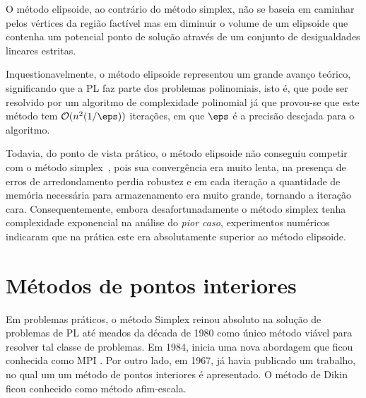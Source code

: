 O  método elipsoide, ao contrário do método simplex,  não se baseia em caminhar pelos
vértices da região factível mas em diminuir o volume de um elipsoide que
contenha um potencial ponto de solução através de um conjunto de desigualdades
lineares estritas.

Inquestionavelmente, o método elipsoide representou um grande avanço teórico,
significando que a \acl{PL} faz parte dos problemas polinomiais, isto é, que
pode ser resolvido por um algoritmo de complexidade polinomial já que provou-se
que este método tem $\mathcal{O}(n^2(1/\eps))$ iterações, em
que $\eps$ é a precisão desejada para o algoritmo.

Todavia, do ponto de vista prático, o método elipsoide não conseguiu competir com o
método simplex~\cite{Bland:1981vn}, pois sua convergência era muito lenta, na
presença de erros de arredondamento perdia robustez e em cada iteração a
quantidade de memória necessária para armazenamento era muito grande, tornando a iteração cara.
Consequentemente, embora desafortunadamente o método simplex tenha complexidade
exponencial na análise do \emph{pior caso}, experimentos numéricos indicaram que
na prática este era absolutamente superior ao método elipsoide.


\section{Métodos de pontos interiores}



Em problemas práticos, o método Simplex reinou absoluto na solução de problemas
de \ac{PL} até meados da década de 1980 como único método viável para resolver
tal classe de problemas. Em 1984, \textcite{Karmarkar:1984cp} inicia uma nova
abordagem que ficou conhecida como
\acf{MPI} . Por outro lado,  em 1967,
\textcite{DIKIN:InterativeSol1967} já havia publicado um trabalho, no qual um 
 um método de pontos interiores é apresentado. O método de Dikin ficou
conhecido como método afim-escala.
      



